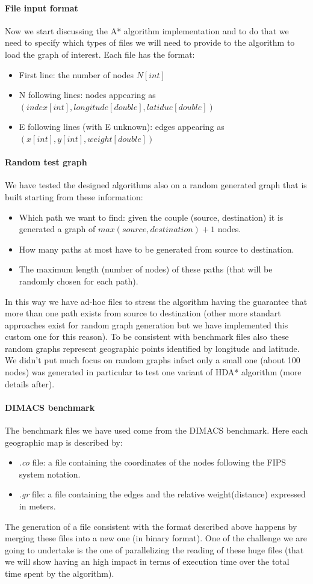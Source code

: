 \documentclass[twocolumn, switch]{article} %
\begin{document}
\paragraph{File input format} 
Now we start discussing the A* algorithm implementation and to do that we need to specify which 
types of files we will need to provide to the algorithm to load the graph of interest. Each file has 
the format:
\begin{itemize}
    \item First line: the number of nodes $N[int]$
    \item N following lines: nodes appearing as $(index[int], longitude[double], latidue[double])$
    \item E following lines (with E unknown): edges appearing as $(x[int], y[int], weight[double])$
\end{itemize}
\paragraph{Random test graph} We have tested the designed algorithms also on a random generated graph that
is built starting from these information: 
\begin{itemize}
  \item Which path we want to find: given the couple (source, destination) it is generated a graph of
        $max(source, destination) + 1$ nodes.
  \item How many paths at most have to be generated from source to destination.
  \item The maximum length (number of nodes) of these paths (that will be randomly chosen for each path).
\end{itemize}
In this way we have ad-hoc files to stress the algorithm having the guarantee that more than one path
exists from source to destination (other more standart approaches exist for random graph generation but we
have implemented this custom one for this reason). To be consistent with benchmark files also these
random graphs represent geographic points identified by longitude and latitude. We didn't put much focus on random graphs
infact only a small one (about 100 nodes) was generated in particular to test one variant of HDA* algorithm
(more details after).
\paragraph{DIMACS benchmark} 
The benchmark files we have used come from the DIMACS benchmark. Here each geographic map is described by:
\begin{itemize}
  \item \textit{.co} file: a file containing the coordinates of the nodes following the FIPS system notation.
  \item \textit{.gr} file: a file containing the edges and the relative weight(distance) expressed in meters.
\end{itemize}
The generation of a file consistent with the format described above happens by merging these files 
into a new one (in binary format). One of the challenge we are going to undertake is the one of
parallelizing the reading of these huge files (that we will show having an high impact in terms of
execution time over the total time spent by the algorithm).
\end{document}
